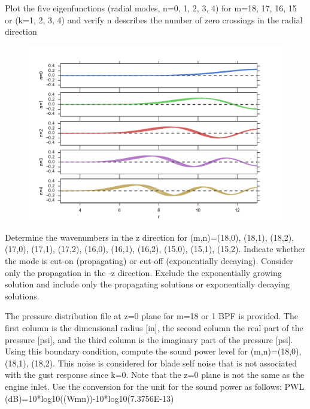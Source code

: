 \documentclass[onecolumn,10pt]{jhwhw}
\begin{document}
\clearpage
\problem{[20 points]}
Plot the five eigenfunctions (radial modes, n=0, 1, 2, 3, 4) for m=18, 17, 16, 15 or (k=1, 2, 3, 4) and verify n describes the number of zero crossings in the radial direction

\begin{figure}[h]
  \centering
  \includegraphics[width=\textwidth]{figs/problem2.pdf}%
\end{figure}

\problem{[20 points]}
Determine the wavenumbers in the z direction for (m,n)=(18,0), (18,1), (18,2), (17,0), (17,1), (17,2), (16,0), (16,1), (16,2), (15,0), (15,1), (15,2). Indicate whether the mode is cut-on (propagating) or cut-off (exponentially decaying). Consider only the propagation in the -z direction. Exclude the exponentially growing solution and include only the propagating solutions or exponentially decaying solutions.

\problem{[30 points]}
The pressure distribution file at z=0 plane for m=18 or 1 BPF is provided. The first column is the dimensional radius [in], the second column the real part of the pressure [psi], and the third column is the imaginary part of the pressure [psi]. Using this boundary condition, compute the sound power level for (m,n)=(18,0), (18,1), (18,2). This noise is considered for blade self noise that is not associated with the gust response since k=0. Note that the z=0 plane is not the same as the engine inlet. Use the conversion for the unit for the sound power as follows: PWL (dB)=10*log10((Wmn))-10*log10(7.3756E-13)
\end{document}
